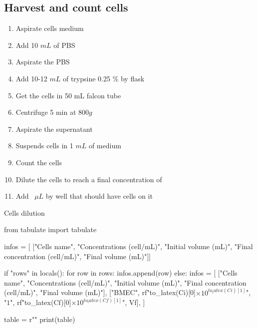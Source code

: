 \subsection{Harvest and count cells}

\begin{enumerate}
\item Aspirate cells medium 
\item Add 10 $mL$ of PBS 
\item Aspirate the PBS
\item Add 10-12 $mL$ of trypsine 0.25 \% by flask
\item Get the cells in 50 mL falcon tube
\item Centrifuge 5 min at 800$g$
\item Aspirate the supernatant 
\item Suspends cells in 1 $mL$ of medium 
\item Count the cells
\item Dilute the cells to reach a final concentration of 
\item Add ~$\mu L$ by well that should have cells on it
\end{enumerate}

\begin{table}[h]
\caption{Cells dilution}
\begin{pycode}

from tabulate import tabulate

infos = [
    ["Cells name", "Concentrations (cell/mL)", "Initial volume (mL)", "Final concentration (cell/mL)", "Final volume (mL)"]]
    
if "rows" in locals():
    for row in rows:
        infos.append(row)
else:   
    infos = [
    ["Cells name", "Concentrations (cell/mL)", "Initial volume (mL)", "Final concentration (cell/mL)", "Final volume (mL)"],
    ["BMEC", rf"{to_latex(Ci)[0]}$\times 10^{to_latex(Ci)[1]}$", "$1$", rf"{to_latex(Cf)[0]}$\times 10^{to_latex(Cf)[1]}$", Vf],
]

table = r""
print(table)
\end{pycode}
\label{table-comptage-cellules}
\end{table}
